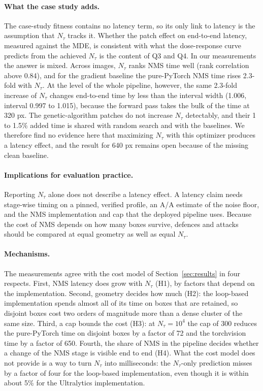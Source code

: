 \documentclass[a4paper,fleqn]{cas-dc}
\newcommand{\Ntau}{N_{\tau}}
\begin{document}
\paragraph{What the case study adds.}
The case-study fitness contains no latency term, so its only link to latency is the assumption that $\Ntau$ tracks it. Whether the patch effect on end-to-end latency, measured against the MDE, is consistent with what the dose-response curve predicts from the achieved $\Ntau$ is the content of Q3 and Q4. In our measurements the answer is mixed. Across images, $\Ntau$ ranks NMS time well (rank correlation above 0.84), and for the gradient baseline the pure-PyTorch NMS time rises 2.3-fold with $\Ntau$. At the level of the whole pipeline, however, the same 2.3-fold increase of $\Ntau$ changes end-to-end time by less than the interval width (1.006, interval 0.997 to 1.015), because the forward pass takes the bulk of the time at 320 px. The genetic-algorithm patches do not increase $\Ntau$ detectably, and their 1 to 1.5\% added time is shared with random search and with the baselines. We therefore find no evidence here that maximizing $\Ntau$ with this optimizer produces a latency effect, and the result for 640 px remains open because of the missing clean baseline.

\paragraph{Implications for evaluation practice.}
Reporting $\Ntau$ alone does not describe a latency effect. A latency claim needs stage-wise timing on a pinned, verified profile, an A/A estimate of the noise floor, and the NMS implementation and cap that the deployed pipeline uses. Because the cost of NMS depends on how many boxes survive, defences and attacks should be compared at equal geometry as well as equal $\Ntau$.

\paragraph{Mechanisms.}
The measurements agree with the cost model of Section~\ref{sec:results} in four respects. First, NMS latency does grow with $\Ntau$ (H1), by factors that depend on the implementation. Second, geometry decides how much (H2): the loop-based implementation spends almost all of its time on boxes that are retained, so disjoint boxes cost two orders of magnitude more than a dense cluster of the same size. Third, a cap bounds the cost (H3): at $\Ntau=10^4$ the cap of 300 reduces the pure-PyTorch time on disjoint boxes by a factor of 72 and the torchvision time by a factor of 650. Fourth, the share of NMS in the pipeline decides whether a change of the NMS stage is visible end to end (H4). What the cost model does not provide is a way to turn $\Ntau$ into milliseconds: the $\Ntau$-only prediction misses by a factor of four for the loop-based implementation, even though it is within about 5\% for the Ultralytics implementation.
\end{document}
